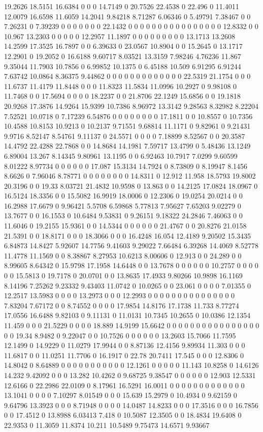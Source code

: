 19.2626 18.5151 16.6384 0 0 0 14.7149 0 20.7526 22.4538 0 22.496 0 11.4011 12.0079 16.6598 11.6059 14.2041 9.84218 8.71287 6.06346 0 5.49791 7.38467 0 0 7.26231 0 7.39239 0 0 0 0 0 0 0 22.1432 0 0 0 0 0 0 0 0 0 0 0 0 0 0 0 0 12.8332 0 0 10.967 13.2303 0 0 0 0 0 12.2957 11.1897 0 0 0 0 0 0 0 0 0 13.1713 13.2608 14.2599 17.3525 16.7897 0 0 6.39633 0 23.0567 10.8904 0 0 15.2645 0 13.1717 12.2901 0 19.2052 0 16.6188 9.60717 8.03521 13.3159 7.98246 4.76236 11.867 9.35044 11.7903 10.7856 0 6.99852 10.1375 0 6.45188 10.509 6.91295 6.91244 7.63742 10.0864 8.36375 9.44862 0 0 0 0 0 0 0 0 0 0 0 0 0 22.5319 21.1754 0 0 0 11.6737 11.4179 11.8448 0 0 0 11.8323 11.5834 11.0996 10.2927 0 9.98108 0 11.7468 0 0 17.5694 0 0 0 0 18.2237 0 0 21.8706 22.1249 15.6856 0 0 19.1818 20.9268 17.3876 14.9264 15.9399 10.7386 8.96972 13.3142 9.28563 8.32982 8.22204 7.52521 10.0718 0 7.17239 6.54876 0 0 0 0 0 0 0 0 17.1811 0 0 10.8557 0 10.7356 10.4588 10.8153 10.9213 0 10.2137 9.71551 9.68814 11.1171 0 9.82961 0 9.21431 9.9716 8.52147 8.54761 9.11137 0 24.5571 0 0 0 0 7.18899 8.52567 0 0 20.3587 14.4792 22.4288 22.7868 0 0 14.8684 14.1981 7.59717 13.4799 0 5.48436 13.1249 6.89004 13.267 8.14345 9.80961 13.1195 0 0 6.92463 10.7917 7.0299 9.60599 8.01222 8.97734 0 0 0 0 0 0 17.087 15.3134 14.7924 0 8.73809 0 8.19947 8.1456 8.6626 0 7.96046 8.78771 0 0 0 0 0 0 0 0 14.8311 0 12.912 11.958 18.5793 19.8002 20.3196 0 0 19.33 8.03721 21.4832 10.9598 0 13.863 0 0 14.2125 17.0824 18.0967 0 16.5124 18.3356 0 0 15.5082 16.9919 18.0006 0 12.2306 0 19.0254 20.0214 0 0 16.2988 17.6679 0 9.96421 5.5708 6.59868 5.77813 7.95627 7.65203 9.02279 0 13.7677 0 0 16.1553 0 10.6484 9.53831 0 9.26151 9.18322 24.2846 7.46063 0 0 11.6046 0 19.2155 15.9361 0 0 14.5344 0 0 0 0 0 0 21.4767 0 0 20.8276 21.0158 21.5391 0 0 18.8171 0 0 0 18.3066 0 0 0 16.4248 16.054 12.4189 9.20502 15.3435 6.84873 14.8427 5.92607 14.7756 9.41603 9.29022 7.66484 6.39268 14.4069 8.52778 11.4778 11.1569 0 0 8.38867 8.27953 10.6213 8.00606 0 12.913 0 0 24.289 0 0 8.99605 8.64342 0 15.9798 17.1958 14.6448 0 0 13.7678 0 0 0 0 0 0 10.2757 0 0 0 0 0 0 15.5813 0 19.7178 0 20.0701 0 0 13.8635 17.4933 9.80266 10.9898 16.1169 8.14196 7.25262 9.23332 9.43403 11.0742 0 10.0265 0 0 23.061 0 0 0 0 7.01355 0 12.2517 13.5983 0 0 0 0 13.2973 0 0 0 12.2993 0 0 0 0 0 0 0 0 0 0 0 0 0 0 0 7.83204 7.67172 0 0 8.74552 0 0 0 0 17.9854 14.8176 17.1738 11.733 8.77274 17.0556 16.6488 9.82103 0 9.11131 0 11.0131 10.7345 10.2655 0 10.0386 12.1354 11.459 0 0 0 21.5229 0 0 0 0 18.889 14.9199 15.6642 0 0 0 0 0 0 0 0 0 0 0 0 0 0 0 0 0 0 19.34 8.9482 0 9.22047 0 0 10.7526 0 0 0 0 0 0 13.2603 15.7066 11.7595 12.1499 0 14.9229 0 11.0279 17.9944 0 0 8.87136 12.4156 9.89934 11.303 0 0 0 11.6817 0 0 11.0251 11.7706 0 16.1917 0 22.78 20.7411 17.545 0 0 0 12.8306 0 14.8042 0 8.64889 0 0 0 0 0 0 0 0 0 0 0 12.1261 0 0 0 0 0 11.143 10.8258 0 14.6126 14.232 9.42092 0 0 0 13.282 10.4262 0 9.68725 9.38547 0 0 0 0 0 0 12.903 12.5331 12.6166 0 22.2986 22.0109 0 8.17961 16.5291 16.0011 0 0 0 0 0 0 0 0 0 0 0 0 0 13.1041 0 0 0 0 7.10297 8.01549 0 0 0 15.639 15.2979 0 10.4934 0 9.62159 0 9.64796 13.3923 0 0 0 8.71948 0 0 0 0 14.0487 14.8233 0 0 0 17.3516 0 0 0 16.7856 0 0 17.4512 0 13.8988 6.03413 7.418 0 10.5087 12.3505 0 0 18.4834 19.6408 0 22.9353 0 11.3059 11.8374 10.211 10.5489 9.75473 14.6571 9.93667 